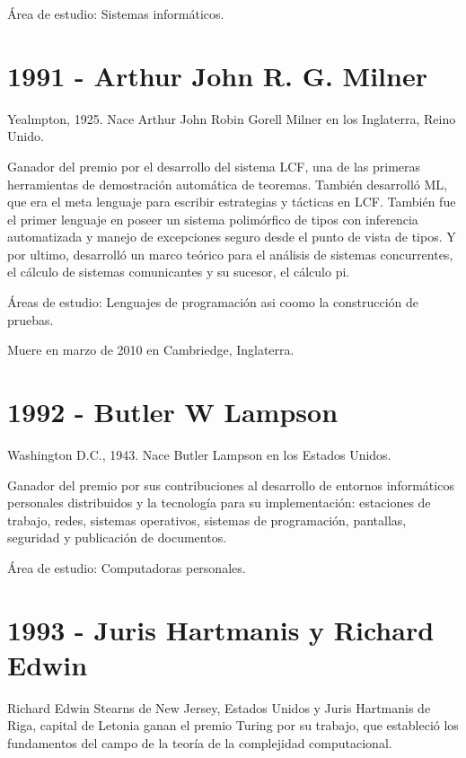 \documentclass[notitlepage,letterpaper, 11pt]{article}
\begin{document}
\noindent Área de estudio: Sistemas informáticos.
\newline

\section*{1991 - Arthur John R. G. Milner}
\noindent Yealmpton, 1925. Nace Arthur John Robin Gorell Milner en los Inglaterra, Reino Unido.

\noindent Ganador del premio por el desarrollo del sistema LCF, una de las primeras herramientas de demostración automática de teoremas. También desarrolló ML, que era el meta lenguaje para escribir estrategias y tácticas en LCF. También fue el primer lenguaje en poseer un sistema polimórfico de tipos con inferencia automatizada y manejo de excepciones seguro desde el punto de vista de tipos.
Y por ultimo, desarrolló un marco teórico para el análisis de sistemas concurrentes, el cálculo de sistemas comunicantes y su sucesor, el cálculo pi.


\noindent Áreas de estudio: Lenguajes de programación asi coomo la construcción de pruebas.

\noindent Muere en marzo de 2010 en Cambriedge, Inglaterra.
\newline

\section*{1992 - Butler W Lampson}
\noindent Washington D.C., 1943. Nace Butler Lampson en los Estados Unidos.

\noindent Ganador del premio por sus contribuciones al desarrollo de entornos informáticos personales distribuidos y la tecnología para su implementación: estaciones de trabajo, redes, sistemas operativos, sistemas de programación, pantallas, seguridad y publicación de documentos.


\noindent Área de estudio: Computadoras personales.
\newline

\section*{1993 - Juris Hartmanis y Richard Edwin}
\noindent Richard Edwin Stearns de New Jersey, Estados Unidos y Juris Hartmanis de Riga, capital de Letonia ganan el premio Turing por su trabajo, que estableció los fundamentos del campo de la teoría de la complejidad computacional.
\end{document}
